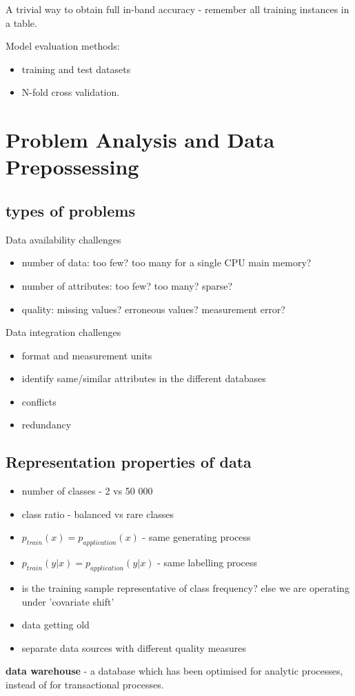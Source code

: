 \documentclass{article}
\newcommand{\para}[0]{\par\vspace{0.2cm}\noindent}
\newcommand{\define}[2]{\textbf{#1} - {#2}.  \para}
\begin{document}
A trivial way to obtain full in-band accuracy - remember all training instances in a table.  \\
\par
Model evaluation methods:
\begin{itemize}
    \item{training and test datasets}
    \item{N-fold cross validation.}
\end{itemize}


\section{Problem Analysis and Data Prepossessing}
\subsection{types of problems}
Data availability challenges
\begin{itemize}
    \item{number of data: too few? too many for a single CPU main memory?}
    \item{number of attributes: too few? too many? sparse?}
    \item{quality: missing values? erroneous values? measurement error?}
\end{itemize}
\par
Data integration challenges
\begin{itemize}
    \item{format and measurement units}
    \item{identify same/similar attributes in the different databases}
    \item{conflicts}
    \item{redundancy}
\end{itemize}


\subsection{Representation properties of data}
\begin{itemize}
    \item{number of classes - 2 vs 50 000}
    \item{class ratio - balanced vs rare classes}
    \item{$p_{train}(x) = p_{application}(x)$ - same generating process}
    \item{$p_{train}(y|x) = p_{application}(y|x)$ - same labelling process}
    \item{is the training sample representative of class frequency? else we are operating under 'covariate shift'}
    \item{data getting old}
    \item{separate data sources with different quality measures}
\end{itemize}
\para
\define{data warehouse}
           {a database which has been optimised for analytic processes, instead of for transactional processes}
\end{document}
